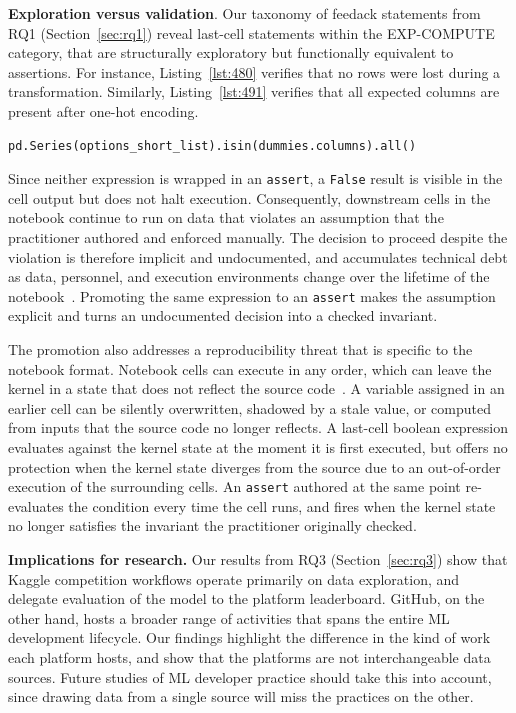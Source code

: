 \documentclass[a4paper,USenglish,cleveref,autoref,thm-restate,anonymous]{lipics-v2021}       %
\begin{document}
\textbf{Exploration versus validation}.
Our taxonomy of feedack statements from RQ1 (Section~\ref{sec:rq1})
reveal last-cell statements within the EXP-COMPUTE category,
that are structurally exploratory
but functionally equivalent to assertions.
For instance, Listing~\ref{lst:480} verifies that no rows were lost during a transformation.
Similarly, Listing~\ref{lst:491} verifies that all expected columns are present after one-hot encoding.

\begin{lstlisting}[caption={Verify that all expected columns are present after one-hot encoding.}, label={lst:491}]
pd.Series(options_short_list).isin(dummies.columns).all()
\end{lstlisting}

Since neither expression is wrapped in an \lstinline{assert},
a \lstinline{False} result is visible in the cell output
but does not halt execution.
Consequently, downstream cells in the notebook
continue to run on data
that violates an assumption
that the practitioner authored and enforced manually.
The decision to proceed despite the violation
is therefore implicit and undocumented,
and accumulates technical debt
as data, personnel, and execution environments change
over the lifetime of the notebook~\cite{sculley2015hidden,sambasivan2021everyone,pimentel2019large-scale}.
Promoting the same expression to an \lstinline{assert}
makes the assumption explicit
and turns an undocumented decision into a checked invariant.

The promotion also addresses a reproducibility threat
that is specific to the notebook format.
Notebook cells can execute in any order,
which can leave the kernel in a state
that does not reflect the source code~\cite{wang2020assessing,pimentel2019large-scale}.
A variable assigned in an earlier cell can be silently overwritten,
shadowed by a stale value,
or computed from inputs
that the source code no longer reflects.
A last-cell boolean expression
evaluates against the kernel state at the moment it is first executed,
but offers no protection
when the kernel state diverges from the source
due to an out-of-order execution of the surrounding cells.
An \lstinline{assert} authored at the same point
re-evaluates the condition every time the cell runs,
and fires when the kernel state
no longer satisfies the invariant the practitioner originally checked.

\textbf{Implications for research.}
Our results from RQ3 (Section~\ref{sec:rq3}) show that
Kaggle competition workflows operate primarily on data exploration,
and delegate evaluation of the model to the platform leaderboard.
GitHub, on the other hand, hosts a broader range of activities that spans the entire ML development lifecycle.
Our findings highlight the difference in the kind of work each platform hosts,
and show that the platforms are not interchangeable data sources.
Future studies of ML developer practice
should take this into account,
since drawing data from a single source
will miss the practices on the other.
\end{document}
